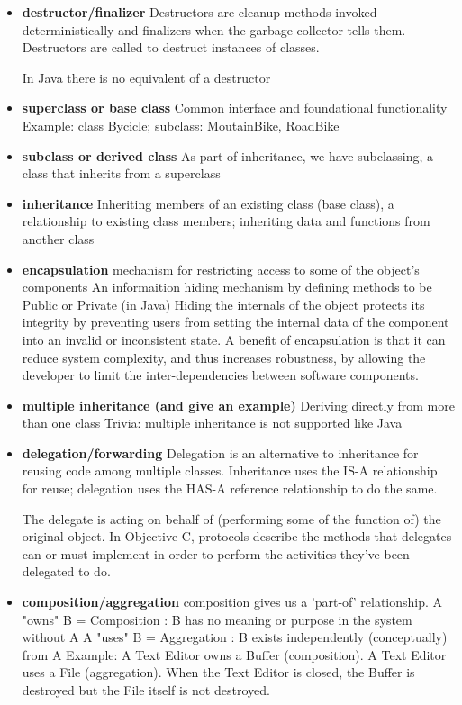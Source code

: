 \documentclass[letterpaper]{article}
\begin{document}
\begin{itemize}
\item {\bf destructor/finalizer
}	Destructors are cleanup methods invoked deterministically and finalizers
	when the garbage collector tells them. Destructors are called to destruct
	instances of classes.

	In Java there is no equivalent of a destructor 


\item {\bf superclass or base class}
	Common interface and foundational functionality
	Example: class Bycicle; subclass: MoutainBike, RoadBike

\item {\bf subclass or derived class}
	As part of inheritance, we have subclassing, a class that inherits from 
	a superclass

\item {\bf inheritance}
	Inheriting members of an existing class (base class), a relationship to 
	existing class members; inheriting data and functions from another class
	
	 \item {\bf 
encapsulation}
	mechanism for restricting access to some of the object's components
	An informaition hiding mechanism by defining methods to be Public or Private
	(in Java)
	Hiding the internals of the object protects its integrity by preventing users 
	from setting the internal data of the component into an invalid or 
	inconsistent state. A benefit of encapsulation is that it can reduce system 
	complexity, and thus increases robustness, by allowing the developer to 
	limit the inter-dependencies between software components. 
\item {\bf 
multiple inheritance (and give an example)
}	Deriving directly from more than one class
	Trivia: multiple inheritance is not supported like Java 

\item {\bf delegation/forwarding
}	Delegation is an alternative to inheritance for reusing
	code among multiple classes. Inheritance uses the
	IS-A relationship for reuse; delegation uses the HAS-A reference 
	relationship to do the same. 	

	The delegate is acting on behalf of (performing some of the function of) 
	the original object.  In Objective-C, protocols describe the methods that 
	delegates can or must implement in order to perform the activities they've 
	been delegated to do. 

\item {\bf composition/aggregation
}	composition gives us a 'part-of' relationship.
	A "owns" B = Composition : B has no meaning or purpose in the system without A
	A "uses" B = Aggregation : B exists independently (conceptually) from A
	Example: A Text Editor owns a Buffer (composition). A Text Editor uses a File (aggregation). When the Text Editor is closed, the Buffer is destroyed but the File itself is not destroyed.


\end{itemize}
\end{document}
